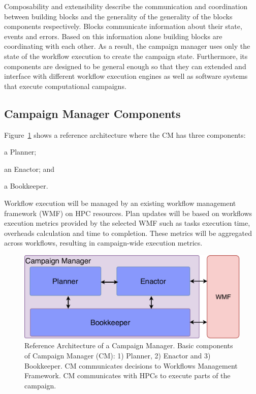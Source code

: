 Composability and extensibility describe the communication and coordination between building blocks and the generality of the generality of the blocks components respectively.
Blocks communicate information about their state, events and errors.
Based on this information alone building blocks are coordinating with each other.
As a result, the campaign manager uses only the state of the workflow execution to create the campaign state.
Furthermore, its components are designed to be general enough so that they can extended and interface with different workflow execution engines as well as software systems that execute computational campaigns.

\subsection{Campaign Manager Components}
\label{ssec:cm_arch}

Figure~\ref{fig:refarch} shows a reference architecture where the CM has three components:
\begin{inparaenum}[(1)]
    \item a Planner;
    \item an Enactor; and
    \item a Bookkeeper. 
\end{inparaenum}
Workflow execution will be managed by an existing workflow management framework (WMF) on HPC resources.
Plan updates will be based on workflows execution metrics provided by the selected WMF such as tasks execution time, overheads calculation and time to completion.
These metrics will be aggregated across workflows, resulting in campaign-wide execution metrics.

\begin{figure}[t]
    \centering
    \includegraphics[width=.95\textwidth]{figures/manager/CEM_design.pdf}
    \caption{Reference Architecture of a Campaign Manager. Basic 
        components of Campaign Manager (CM): 1) Planner, 2) Enactor and 3) Bookkeeper. 
        CM communicates decisions to Workflows Management Framework. CM communicates with HPCs to 
        execute parts of the campaign.}\label{fig:refarch}
\end{figure}

